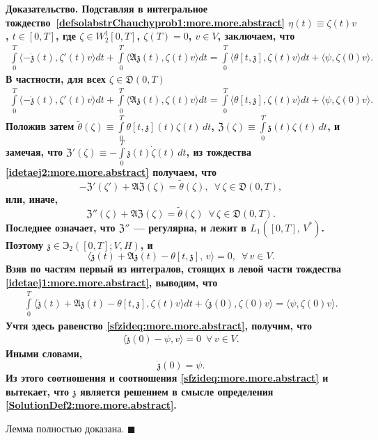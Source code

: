 \documentclass{report}
\newenvironment{Proof}{\par\noindent\bf Доказательство.\rm}{ $\blacksquare$\par}
\begin{document}
\begin{Proof}
Подставляя в интегральное тождество~\eqref{defsolabstrChauchyprob1:more.more.abstract} $\eta(t)\equiv\zeta(t)v$, $t\in[0,T]$, где $\zeta\in W^1_2[0,T]$, $\zeta(T)=0$, $v\in V$, заключаем,
что
\begin{gather}\label{idetaej1:more.more.abstract}
\int\limits_0^T\langle-\dot{\mathfrak{z}}(t),\zeta'(t)v\rangle dt+\int\limits_0^T\langle\mathfrak{A}{\mathfrak{z}}(t), \zeta(t)v\rangle dt=
\int\limits_0^T\langle \theta[t,{\mathfrak{z}}], \zeta(t)v\rangle dt+\langle\psi,\zeta(0)v\rangle.
\end{gather}
В частности, для всех $\zeta\in\mathfrak{D}(0,T)$
\begin{gather}\label{idetaej2:more.more.abstract}
\int\limits_0^T\langle-\dot{\mathfrak{z}}(t),\zeta'(t)v\rangle dt+\int\limits_0^T\langle\mathfrak{A}{\mathfrak{z}}(t), \zeta(t)v\rangle dt=
\int\limits_0^T\langle \theta[t,{\mathfrak{z}}], \zeta(t)v\rangle dt+\langle\psi,\zeta(0)v\rangle.
\end{gather}
Положив затем $\tilde{\theta}(\zeta)\equiv\int\limits_{0}^{T}\theta[t,{\mathfrak{z}}](t)\zeta(t)\,dt$, ${\mathfrak{Z}}(\zeta)\equiv\int\limits_{0}^{T}{\mathfrak{z}}(t)\zeta(t)\,dt$, и
замечая, что ${\mathfrak{Z}}'(\zeta)\equiv-\int\limits_{0}^{T}{\mathfrak{z}}(t)\dot\zeta(t)\,dt$, из тождества \eqref{idetaej2:more.more.abstract} получаем, что
$$
-{\mathfrak{Z}}'(\zeta')+\mathfrak{A}{\mathfrak{Z}}(\zeta)=\tilde{\theta}(\zeta),\,\,\, \forall\,\zeta\in {\mathfrak{D}}(0,T),
$$
или, иначе,
$$
{\mathfrak{Z}}''(\zeta)+\mathfrak{A}{\mathfrak{Z}}(\zeta)=\tilde{\theta}(\zeta)\,\,\, \forall\,\zeta\in {\mathfrak{D}}(0,T).
$$
Последнее означает, что ${\mathfrak{Z}}''$ --- регулярна, и лежит в $L_1([0,T],\,V^*)$. Поэтому ${\mathfrak{z}}\in{\textbf{Э}}_2([0,T];V,H)$, и
\begin{equation}\label{sfzideq:more.more.abstract}
\langle\ddot{\mathfrak{z}}(t)+\mathfrak{A}{\mathfrak{z}}(t)-\theta[t,{\mathfrak{z}}],\,v\rangle=0,\,\,\,\forall\,v\in V.
\end{equation}
Взяв по частям первый из интегралов, стоящих в левой части тождества \ref{idetaej1:more.more.abstract}, выводим, что
\begin{gather*}
\int\limits_0^T\langle\ddot{\mathfrak{z}}(t)+\mathfrak{A}{\mathfrak{z}}(t)-\theta[t,{\mathfrak{z}}],\zeta(t)v\rangle dt+\langle\dot{\mathfrak{z}}(0),\zeta(0)v\rangle=
\langle\psi,\zeta(0)v\rangle.
\end{gather*}
Учтя здесь равенство \eqref{sfzideq:more.more.abstract}, получим, что
\begin{gather*}
\langle\dot{\mathfrak{z}}(0)-\psi,v\rangle=0\,\,\,\forall\,v\in V.
\end{gather*}
Иными словами,
$$
\dot{\mathfrak{z}}(0)=\psi.
$$
Из этого соотношения и соотношения \eqref{sfzideq:more.more.abstract} и вытекает, что $\mathfrak{z}$ является решением в смысле определения \ref{SolutionDef2:more.more.abstract}.

Лемма полностью доказана.
\end{Proof}
\end{document}
